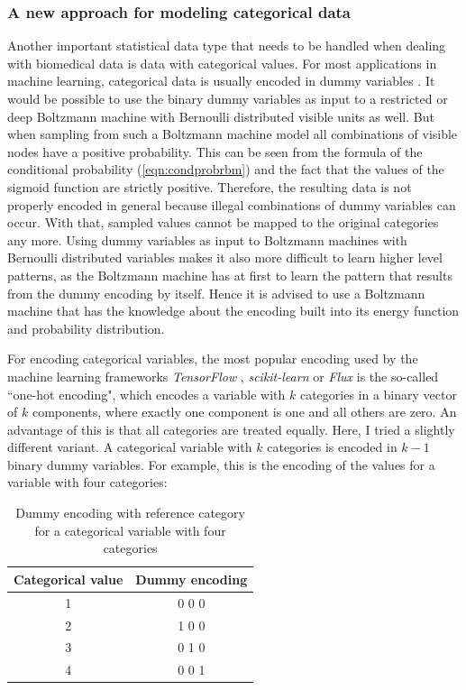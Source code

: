 \documentclass[12pt]{article}
\newcommand{\apkg}[1]{\emph{#1}}
\begin{document}
\subsubsection{A new approach for modeling categorical data}\label{methodsoftmax0}
Another important statistical data type that needs to be handled when dealing with biomedical data is data with categorical values.
For most applications in machine learning, categorical data is usually encoded in dummy variables \citep{hastie_elements}.
It would be possible to use the binary dummy variables as input to a restricted or deep Boltzmann machine with Bernoulli distributed visible units as well.
But when sampling from such a Boltzmann machine model all combinations of visible nodes have a positive probability. This can be seen from the formula of the conditional probability (\ref{eqn:condprobrbm}) and the fact that the values of the sigmoid function are strictly positive.
Therefore, the resulting data is not properly encoded in general  because illegal combinations of dummy variables can occur. With that, sampled values cannot be mapped to the original categories any more.
Using dummy variables as input to Boltzmann machines with Bernoulli distributed variables makes it also more difficult to learn higher level patterns, as the Boltzmann machine has at first to learn the pattern that results from the dummy encoding  by itself. Hence it is advised to use a Boltzmann machine that has the knowledge about the encoding built into its energy function and probability distribution.


For encoding categorical variables, the most popular encoding used by the machine learning frameworks \apkg{TensorFlow} \citep{tensorflow}, \apkg{scikit-learn} \citep{scikit-learn} or \apkg{Flux} \citep{flux} is the so-called ``one-hot encoding", which encodes a variable with $k$ categories in a binary vector of $k$ components, where exactly one component is one and all others are zero.
An advantage of this is that all categories are treated equally. 
Here, I tried a slightly different variant.
A categorical variable with $k$ categories is encoded in $k-1$ binary dummy variables.
For example, this is the encoding of the values for a variable with four categories:

\begin{table}[h!]
\centering
\begin{tabular}{cc}
Categorical value & Dummy encoding \\
\hline
1 & 0 0 0 \\
2 & 1 0 0 \\
3 & 0 1 0 \\
4 & 0 0 1 \\
\end{tabular}
\caption{Dummy encoding with reference category for a categorical variable with four categories}\label{dummenc}
\end{table}
\end{document}
